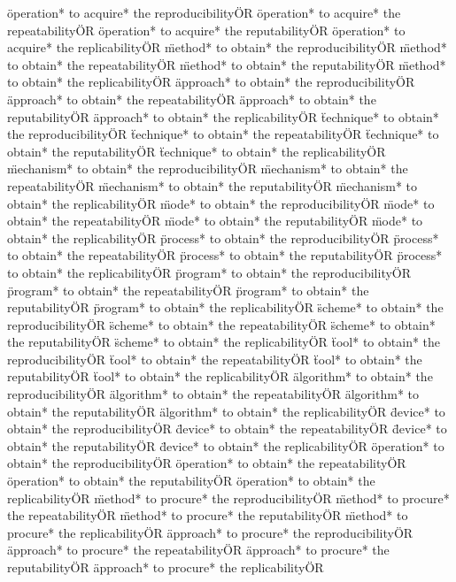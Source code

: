 \documentclass[
10pt, %
a4paper, %
oneside, %
headinclude,footinclude, %
BCOR5mm, %
]{scrartcl}
\begin{document}
\"operation* to acquire* the reproducibility\" OR \"operation* to acquire* the repeatability\" OR \"operation* to acquire* the reputability\" OR \"operation* to acquire* the replicability\" OR 
\"method* to obtain* the reproducibility\" OR \"method* to obtain* the repeatability\" OR \"method* to obtain* the reputability\" OR \"method* to obtain* the replicability\" OR 
\"approach* to obtain* the reproducibility\" OR \"approach* to obtain* the repeatability\" OR \"approach* to obtain* the reputability\" OR \"approach* to obtain* the replicability\" OR 
\"technique* to obtain* the reproducibility\" OR \"technique* to obtain* the repeatability\" OR \"technique* to obtain* the reputability\" OR \"technique* to obtain* the replicability\" OR 
\"mechanism* to obtain* the reproducibility\" OR \"mechanism* to obtain* the repeatability\" OR \"mechanism* to obtain* the reputability\" OR \"mechanism* to obtain* the replicability\" OR 
\"mode* to obtain* the reproducibility\" OR \"mode* to obtain* the repeatability\" OR \"mode* to obtain* the reputability\" OR \"mode* to obtain* the replicability\" OR 
\"process* to obtain* the reproducibility\" OR \"process* to obtain* the repeatability\" OR \"process* to obtain* the reputability\" OR \"process* to obtain* the replicability\" OR 
\"program* to obtain* the reproducibility\" OR \"program* to obtain* the repeatability\" OR \"program* to obtain* the reputability\" OR \"program* to obtain* the replicability\" OR 
\"scheme* to obtain* the reproducibility\" OR \"scheme* to obtain* the repeatability\" OR \"scheme* to obtain* the reputability\" OR \"scheme* to obtain* the replicability\" OR 
\"tool* to obtain* the reproducibility\" OR \"tool* to obtain* the repeatability\" OR \"tool* to obtain* the reputability\" OR \"tool* to obtain* the replicability\" OR 
\"algorithm* to obtain* the reproducibility\" OR \"algorithm* to obtain* the repeatability\" OR \"algorithm* to obtain* the reputability\" OR \"algorithm* to obtain* the replicability\" OR 
\"device* to obtain* the reproducibility\" OR \"device* to obtain* the repeatability\" OR \"device* to obtain* the reputability\" OR \"device* to obtain* the replicability\" OR 
\"operation* to obtain* the reproducibility\" OR \"operation* to obtain* the repeatability\" OR \"operation* to obtain* the reputability\" OR \"operation* to obtain* the replicability\" OR 
\"method* to procure* the reproducibility\" OR \"method* to procure* the repeatability\" OR \"method* to procure* the reputability\" OR \"method* to procure* the replicability\" OR 
\"approach* to procure* the reproducibility\" OR \"approach* to procure* the repeatability\" OR \"approach* to procure* the reputability\" OR \"approach* to procure* the replicability\" OR 
\end{document}

